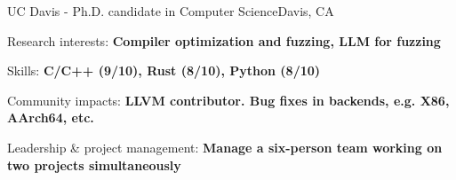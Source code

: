 \renewcommand{\timeInterval}{\DTMdisplaydate{2019}{9}{27}{-1} - }

\ifx\lang\eng
	\begin{rSubsection}{UC Davis}{\timeInterval}{Ph.D. candidate in Computer Science}{Davis, CA}
		\item Research interests: \textbf{Compiler optimization and fuzzing, LLM for fuzzing}
		\item Skills: \textbf{C/C++ (9/10), Rust (8/10), Python (8/10)}
		\item Community impacts: \textbf{LLVM contributor. Bug fixes in backends, e.g. X86, AArch64, etc.}
		\item Leadership \& project management: \textbf{Manage a six-person team working on two projects simultaneously}
	\end{rSubsection}
	\vspace{-0.1em}
\else
\fi

\renewcommand{\timeInterval}{}